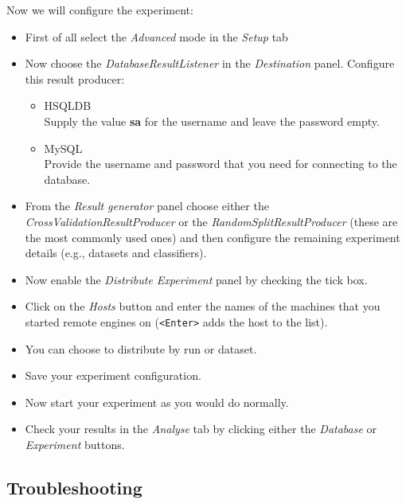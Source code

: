 \documentclass[a4paper]{article}
\begin{document}
Now we will configure the experiment:

\begin{itemize}
   \item First of all select the \textit{Advanced} mode in the \textit{Setup} tab
   \item Now choose the \textit{DatabaseResultListener} in the \textit{Destination} panel. Configure this result producer:
   	\begin{itemize}
    		\item HSQLDB \\ Supply the value \textbf{sa} for the username and leave the password empty.
    		\item MySQL \\ Provide the username and password that you need for connecting to the database.
    	\end{itemize}
   \item From the \textit{Result generator} panel choose either the \textit{CrossValidationResultProducer} or the \textit{RandomSplitResultProducer} (these are the most commonly used ones) and then configure the remaining experiment details (e.g., datasets and classifiers).
   \item Now enable the \textit{Distribute Experiment} panel by checking the tick box.
   \item Click on the \textit{Hosts} button and enter the names of the machines that you started remote engines on (\texttt{<Enter>} adds the host to the list).
   \item You can choose to distribute by run or dataset.
   \item Save your experiment configuration.
   \item Now start your experiment as you would do normally.
   \item Check your results in the \textit{Analyse} tab by clicking either the \textit{Database} or \textit{Experiment} buttons.
\end{itemize}


\subsection{Troubleshooting}
\end{document}
